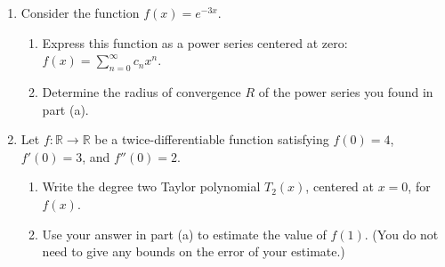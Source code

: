 \documentclass[11pt]{article}
\begin{document}
\begin{enumerate}
\item Consider the function $\displaystyle f(x) = e^{-3x}$.
\begin{enumerate}
\item Express this function as a power series centered at zero: $f(x) = \sum_{n = 0}^{\infty} c_n x^n$.
\item Determine the radius of convergence $R$ of the power series you found in part (a).
\end{enumerate}

\item Let $f\colon \mathbb{R}\to \mathbb{R}$ be a twice-differentiable function satisfying $f(0) = 4$, $f'(0) = 3$, and $f''(0)=2$.
\begin{enumerate}
\item Write the degree two Taylor polynomial $T_2(x)$, centered at $x=0$, for $f(x)$.
\item Use your answer in part (a) to estimate the value of $f(1)$. (You do not need to give any bounds on the error of your estimate.) 
\end{enumerate}

\end{enumerate}
\end{document}
